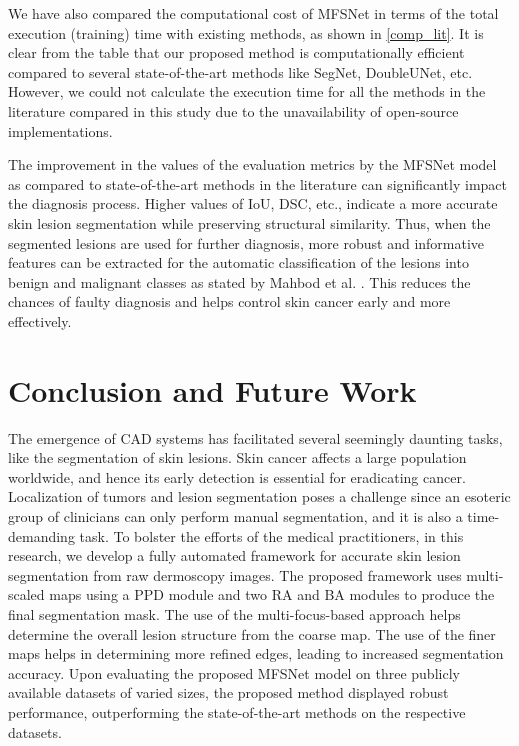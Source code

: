 \documentclass[review]{elsarticle}
\begin{document}
We have also compared the computational cost of MFSNet in terms of the total execution (training) time with existing methods, as shown in \autoref{comp_lit}. It is clear from the table that our proposed method is computationally efficient compared to several state-of-the-art methods like SegNet, DoubleUNet, etc. However, we could not calculate the execution time for all the methods in the literature compared in this study due to the unavailability of open-source implementations.

The improvement in the values of the evaluation metrics by the MFSNet model as compared to state-of-the-art methods in the literature can significantly impact the diagnosis process. Higher values of IoU, DSC, etc., indicate a more accurate skin lesion segmentation while preserving structural similarity. Thus, when the segmented lesions are used for further diagnosis, more robust and informative features can be extracted for the automatic classification of the lesions into benign and malignant classes as stated by Mahbod et al. \cite{mahbod2020effects}. This reduces the chances of faulty diagnosis and helps control skin cancer early and more effectively.


\section{Conclusion and Future Work}\label{conclusions}
The emergence of CAD systems has facilitated several seemingly daunting tasks, like the segmentation of skin lesions. Skin cancer affects a large population worldwide, and hence its early detection is essential for eradicating cancer. Localization of tumors and lesion segmentation poses a challenge since an esoteric group of clinicians can only perform manual segmentation, and it is also a time-demanding task. To bolster the efforts of the medical practitioners, in this research, we develop a fully automated framework for accurate skin lesion segmentation from raw dermoscopy images. The proposed framework uses multi-scaled maps using a PPD module and two RA and BA modules to produce the final segmentation mask. The use of the multi-focus-based approach helps determine the overall lesion structure from the coarse map. The use of the finer maps helps in determining more refined edges, leading to increased segmentation accuracy. Upon evaluating the proposed MFSNet model on three publicly available datasets of varied sizes, the proposed method displayed robust performance, outperforming the state-of-the-art methods on the respective datasets.
\end{document}
